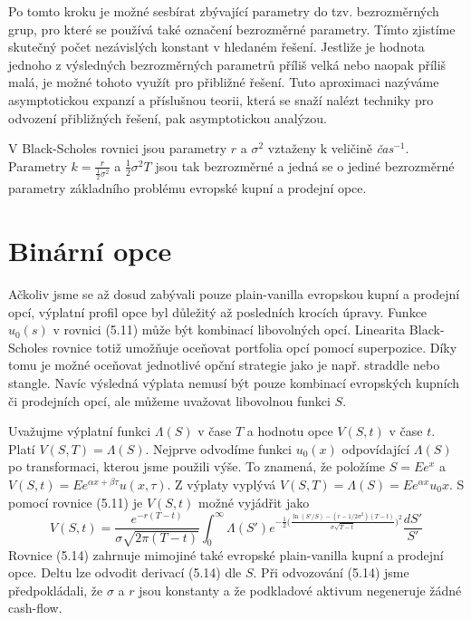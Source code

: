 \documentclass[a4paper]{book}
\begin{document}
Po tomto kroku je možné sesbírat zbývající parametry do tzv. bezrozměrných grup, pro které se používá také označení bezrozměrné parametry. Tímto zjistíme skutečný počet nezávislých konstant v hledaném řešení. Jestliže je hodnota jednoho z výsledných bezrozměrných parametrů příliš velká nebo naopak příliš malá, je možné tohoto využít pro přibližné řešení. Tuto aproximaci nazýváme asymptotickou expanzí a příslušnou teorii, která se snaží nalézt techniky pro odvození přibližných řešení, pak asymptotickou analýzou.

V Black-Scholes rovnici jsou parametry $r$ a $\sigma^2$ vztaženy k veličině \textit{čas}$^{-1}$. Parametry $k = \frac{r}{\frac{1}{2}\sigma^2}$ a $\frac{1}{2}\sigma^2 T$ jsou tak bezrozměrné a jedná se o jediné bezrozměrné parametry základního problému evropské kupní a prodejní opce.

\section{Binární opce}

Ačkoliv jsme se až dosud zabývali pouze plain-vanilla evropskou kupní a prodejní opcí, výplatní profil opce byl důležitý až posledních krocích úpravy. Funkce $u_0(s)$ v rovnici (5.11) může být kombinací libovolných opcí. Linearita Black-Scholes rovnice totiž umožňuje oceňovat portfolia opcí pomocí superpozice. Díky tomu je možné oceňovat jednotlivé opční strategie jako je např. straddle nebo stangle. Navíc výsledná výplata nemusí být pouze kombinací evropských kupních či prodejních opcí, ale můžeme uvažovat libovolnou funkci $S$.

Uvažujme výplatní funkci $\Lambda(S)$ v čase $T$ a hodnotu opce $V(S,t)$ v čase $t$. Platí $V(S,T) = \Lambda(S)$. Nejprve odvodíme funkci $u_0(x)$ odpovídající $\Lambda(S)$ po transformaci, kterou jsme použili výše. To znamená, že položíme $S = Ee^x$ a $V(S,t) = Ee^{\alpha x + \beta \tau}u(x, \tau)$. Z výplaty vyplývá $V(S,T) = \Lambda(S) = Ee^{\alpha x}u_0{x}$. S pomocí rovnice (5.11) je $V(S,t)$ možné vyjádřit jako
\begin{equation}
V(S,t) = \frac{e^{-r(T-t)}}{\sigma \sqrt{2 \pi (T - t)}} \int^{\infty}_{0} \Lambda(S')e^{-\frac{1}{2}\big( \frac{\ln(S'/S)-(r - 1/2 \sigma^2)(T-t)}{\sigma \sqrt{T-t}} \big)^2}\frac{dS'}{S'}
\end{equation}
Rovnice (5.14) zahrnuje mimojiné také evropské plain-vanilla kupní a prodejní opce. Deltu lze odvodit derivací (5.14) dle $S$. Při odvozování (5.14) jsme předpokládali, že $\sigma$ a $r$ jsou konstanty a že podkladové aktivum negeneruje žádné cash-flow.
\end{document}
